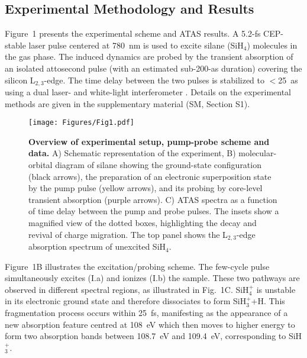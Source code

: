 \documentclass[12pt]{article}
\begin{document}
\subsection{Experimental Methodology and Results}
Figure~1 presents the experimental scheme and ATAS results. A 5.2-fs CEP-stable laser pulse centered at 780~nm is used to excite silane (SiH$_4$) molecules in the gas phase. The induced dynamics are probed by the transient absorption of an isolated attosecond pulse (with an estimated sub-200-as duration) covering the silicon L$_{2,3}$-edge. The time delay between the two pulses is stabilized to $<$25~as using a dual laser- and white-light interferometer \cite{huppert15a}. Details on the experimental methods are given in the supplementary material (SM, Section S1).
%
\begin{figure}
    \centering
    \texttt{[image: Figures/Fig1.pdf]}
    \caption{
    \textbf{Overview of experimental setup, pump-probe scheme and data.} A) Schematic representation of the experiment, B) molecular-orbital diagram of silane showing the ground-state configuration (black arrows), the preparation of an electronic superposition state by the pump pulse (yellow arrows), and its probing by core-level transient absorption (purple arrows). C) ATAS spectra as a function of time delay between the pump and probe pulses. The insets show a magnified view of the dotted boxes, highlighting the decay and revival of charge migration. The top panel shows the L$_{2,3}$-edge absorption spectrum of unexcited SiH$_4$.
    }
    \label{setupcluster}
\end{figure}
%
Figure~1B illustrates the excitation/probing scheme. The few-cycle pulse simultaneously excites (I.a) and ionizes (I.b) the sample. These two pathways are observed in different spectral regions, as illustrated in Fig.~1C. SiH$_4^+$ is unstable in its electronic ground state and therefore dissociates to form SiH$_3^+$+H. This fragmentation process occurs within 25~fs, manifesting as the appearance of a new absorption feature centred at 108~eV which then moves to higher energy to form two absorption bands between 108.7~eV and 109.4~eV, corresponding to SiH$_3^+$.
\end{document}
